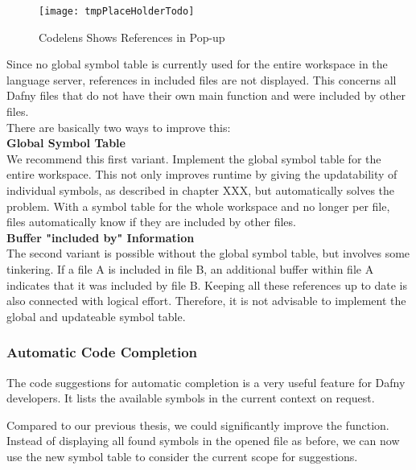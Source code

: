 \begin{figure}[H]
    \centering
    \texttt{[image: tmpPlaceHolderTodo]}
    \caption{Codelens Shows References in Pop-up}
    \label{fig:result_codelens_references_popup}
\end{figure}

Since no global symbol table is currently used for the entire workspace in the language server,
references in included files are not displayed.
This concerns all Dafny files that do not have their own main function and were included by other files. \\

There are basically two ways to improve this: \\

\textbf{Global Symbol Table}\\
We recommend this first variant.
Implement the global symbol table for the entire workspace.
This not only improves runtime by giving the updatability of individual symbols,
as described in chapter XXX, but automatically solves the problem.
With a symbol table for the whole workspace and no longer per file,
files automatically know if they are included by other files. \\

\textbf{Buffer "included by" Information}\\
The second variant is possible without the global symbol table, but involves some tinkering.
If a file A is included in file B, an additional buffer within file A indicates that it was included by file B.
Keeping all these references up to date is also connected with logical effort.
Therefore, it is not advisable to implement the global and updateable symbol table.


\subsubsection{Automatic Code Completion}
The code suggestions for automatic completion is a very useful feature for Dafny developers.
It lists the available symbols in the current context on request.

Compared to our previous thesis, we could significantly improve the function.
Instead of displaying all found symbols in the opened file as before,
we can now use the new symbol table to consider the current scope for suggestions. \\

